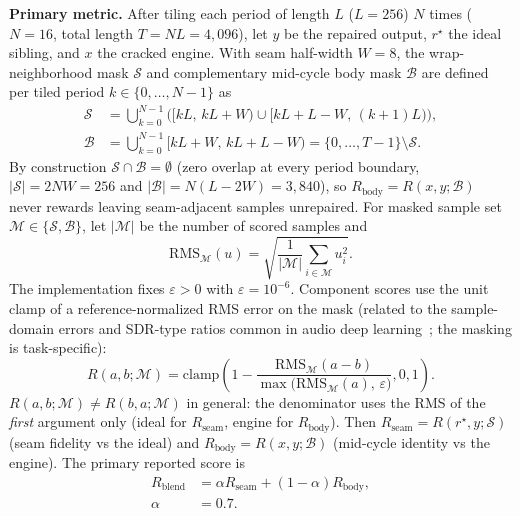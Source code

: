 \textbf{Primary metric.}
After tiling each period of length $L$ ($L{=}256$) $N$ times ($N{=}16$, total length $T{=}N L{=}4{,}096$), let $y$ be the repaired output, $r^{\star}$ the ideal sibling, and $x$ the cracked engine.
With seam half-width $W{=}8$, the wrap-neighborhood mask $\mathcal{S}$ and complementary mid-cycle body mask $\mathcal{B}$ are defined per tiled period $k\in\{0,\dots,N{-}1\}$ as
\begin{equation}
\label{eq:mask-SB}
\begin{aligned}
\mathcal{S} &= \bigcup_{k=0}^{N-1}\bigl([kL,\,kL{+}W)\cup[kL{+}L{-}W,\,(k{+}1)L)\bigr),\\
\mathcal{B} &= \bigcup_{k=0}^{N-1}[kL{+}W,\,kL{+}L{-}W) = \{0,\dots,T{-}1\}\setminus\mathcal{S}.
\end{aligned}
\end{equation}
By construction $\mathcal{S}\cap\mathcal{B}=\emptyset$ (zero overlap at every period boundary, $|\mathcal{S}|=2NW=256$ and $|\mathcal{B}|=N(L-2W)=3{,}840$), so $R_{\mathrm{body}}=R(x,y;\mathcal{B})$ never rewards leaving seam-adjacent samples unrepaired.
For masked sample set $\mathcal{M}\in\{\mathcal{S},\mathcal{B}\}$, let $|\mathcal{M}|$ be the number of scored samples and
\begin{equation}
\mathrm{RMS}_{\mathcal{M}}(u)=\sqrt{\frac{1}{|\mathcal{M}|}\sum_{i\in\mathcal{M}} u_i^2}.
\end{equation}
The implementation fixes $\varepsilon>0$ with $\varepsilon=10^{-6}$.
Component scores use the unit clamp of a reference-normalized RMS error on the mask (related to the sample-domain errors and SDR-type ratios common in audio deep learning~\cite{purwins2019}; the masking is task-specific):
\begin{equation}
\label{eq:R-component}
R(a,b;\mathcal{M})
=\mathrm{clamp}\!\left(
  1-\frac{\mathrm{RMS}_{\mathcal{M}}(a-b)}
         {\max\!\bigl(\mathrm{RMS}_{\mathcal{M}}(a),\,\varepsilon\bigr)},
  0,1\right).
\end{equation}
$R(a,b;\mathcal{M})\neq R(b,a;\mathcal{M})$ in general: the denominator uses the RMS of the \emph{first} argument only (ideal for $R_{\mathrm{seam}}$, engine for $R_{\mathrm{body}}$).
Then $R_{\mathrm{seam}}=R(r^{\star},y;\mathcal{S})$ (seam fidelity vs the ideal) and
$R_{\mathrm{body}}=R(x,y;\mathcal{B})$ (mid-cycle identity vs the engine).
The primary reported score is
\begin{equation}
\label{eq:R-blend}
\begin{aligned}
R_{\mathrm{blend}}
&=\alpha R_{\mathrm{seam}}+(1-\alpha)R_{\mathrm{body}},\\
\alpha&=0.7.
\end{aligned}
\end{equation}

